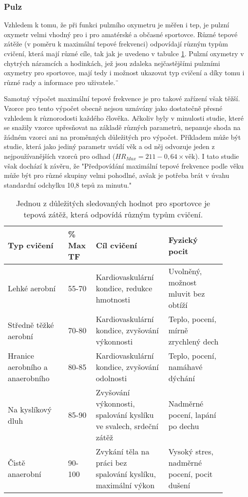 \subsubsection {Pulz}
Vzhledem k tomu, že při funkci pulzního oxymetru je měřen i tep, je pulzní oxymetr velmi vhodný pro i pro amatérské a občasné sportovce. Různé tepové zátěže (v poměru k maximální tepové frekvenci) odpovídají různým typům cvičení, která mají různé cíle, tak jak je uvedeno v tabulce \ref{tab:MTF}. Pulzní oxymetry v chytrých náramcích a hodinkách, jež jsou zdaleka nejčastějšími pulzními oxymetry pro sportovce, mají tedy i možnost ukazovat typ cvičení a díky tomu i různé rady a informace pro uživatele.¨
\par Samotný výpočet maximální tepové frekvence je pro takové zařízení však těžší. Vzorce pro tento výpočet obecně nejsou uznávány jako dostatečně přesné vzhledem k různorodosti každého člověka. Ačkoliv byly v minulosti studie, které se snažily vzorce upřesňovat na základě různých parametrů, nepanuje shoda na žádném vzorci ani na proměnných důležitých pro výpočet. Příkladem může být studie, která jako jediný parametr uvádí věk a od něj odvozuje jeden z nejpoužívanějších vzorců pro odhad ($HR_{Max}=211-0,64\times\text{věk}$). I tato studie však dochází k závěru, že "Předpovídání maximální tepové frekvence podle věku může být pro různé skupiny velmi pohodlné, avšak je potřeba brát v úvahu standardní odchylku 10,8 tepů za minutu." \citep{maxHR}
\begin{table}[H]
    \centering
    \begin{tabular}{p{0.25\linewidth} | p{0.1\linewidth} | p{0.30\linewidth} | p{0.24\linewidth}}
        \textbf{Typ cvičení}            & \textbf{\% Max TF} & \textbf{Cíl cvičení}                                              & \textbf{Fyzický pocit}              \\ \hline
        Lehké aerobní                   & 55-70                    & Kardiovaskulární kondice, redukce hmotnosti                       & Uvolněný, možnost mluvit bez obtíží \\
        Středně těžké aerobní           & 70-80                    & Kardiovaskulární kondice, zvyšování výkonnosti                    & Teplo, pocení, mírně zrychlený dech \\
        Hranice aerobního a anaerobního & 80-85                    & Kardiovaskulární kondice, zvyšování odolnosti                     & Teplo, pocení, namáhavé dýchání     \\
        Na kyslíkový dluh               & 85-90                    & Zvyšování výkonnosti, spalování kyslíku ve svalech, srdeční zátěž & Nadměrné pocení, lapání po dechu    \\
        Čistě anaerobní                 & 90-100                   & Zvykání těla na práci bez spalování kyslíku, maximální výkon      & Vysoký stres, nadměrné pocení, pocit dušení
    \end{tabular}
    \caption[Typy cvičení podle maximální tepové frekvence]{Jednou z důležitých sledovaných hodnot pro sportovce je tepová zátěž, která odpovídá různým typům cvičení. \citep{tep}}%
    \label{tab:MTF}
\end{table}

